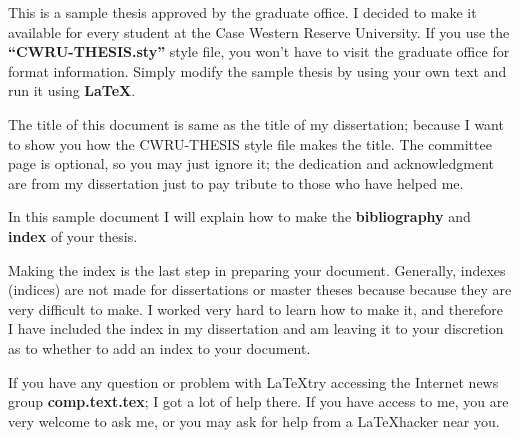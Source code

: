 
\abstractheader
This is a sample thesis approved by the graduate office. I decided to
make it available for every student at the Case Western Reserve
University. If you use the {\bf``CWRU-THESIS.sty''} style file, you
won't have to visit the graduate office for format information. Simply
modify the sample thesis by using your own text and run it using
{\bf\LaTeX}.

The title of this document is same as the title of my dissertation;
because I want to show you how the CWRU-THESIS style file makes the
title. The committee page is optional, so you may just ignore it; the
dedication and acknowledgment are from my dissertation just to pay
tribute to those who have helped me.

In this sample document I will explain how to make the {\bf
bibliography} and {\bf index} of your thesis.

Making the index is the last step in preparing your document.
Generally, indexes (indices) are not made for dissertations or master
theses because because they are very difficult to make. I worked very
hard to learn how to make it, and therefore I have included the index
in my dissertation and am leaving it to your discretion as to whether
to add an index to your document.

If you have any question or problem with \LaTeX try accessing the
Internet news group {\bf comp.text.tex}; I got a lot of help there. If
you have access to me, you are very welcome to ask me, or you may ask
for help from a \LaTeX hacker near you.
